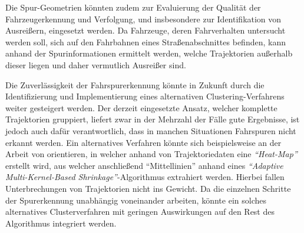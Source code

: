 Die Spur-Geometrien könnten zudem zur Evaluierung der Qualität der Fahrzeugerkennung und Verfolgung,
und insbesondere zur Identifikation von Ausreißern, eingesetzt werden.
Da Fahrzeuge, deren Fahrverhalten untersucht werden soll, sich auf den Fahrbahnen eines Straßenabschnittes befinden,
kann anhand der Spurinformationen ermittelt werden, welche Trajektorien außerhalb dieser liegen und
daher vermutlich Ausreißer sind.

Die Zuverlässigkeit der Fahrspurerkennung könnte in Zukunft durch die Identifizierung und Implementierung
eines alternativen Clustering-Verfahrens weiter gesteigert werden.
Der derzeit eingesetzte Ansatz, welcher komplette Trajektorien gruppiert, liefert zwar in der Mehrzahl der Fälle
gute Ergebnisse, ist jedoch auch dafür verantwortlich, dass in manchen Situationen Fahrspuren nicht erkannt werden.
Ein alternatives Verfahren könnte sich beispielsweise an der Arbeit von \cite[]{Xu2015} orientieren, in welcher
anhand von Trajektoriedaten eine \textit{``Heat-Map''} erstellt wird, aus welcher anschließend ``Mittellinien''
anhand eines \textit{``Adaptive Multi-Kernel-Based Shrinkage''}-Algorithmus extrahiert werden.
Hierbei fallen Unterbrechungen von Trajektorien nicht ins Gewicht.
Da die einzelnen Schritte der Spurerkennung unabhängig voneinander arbeiten, könnte ein
solches alternatives Clusterverfahren mit geringen Auswirkungen auf den Rest des Algorithmus integriert werden.